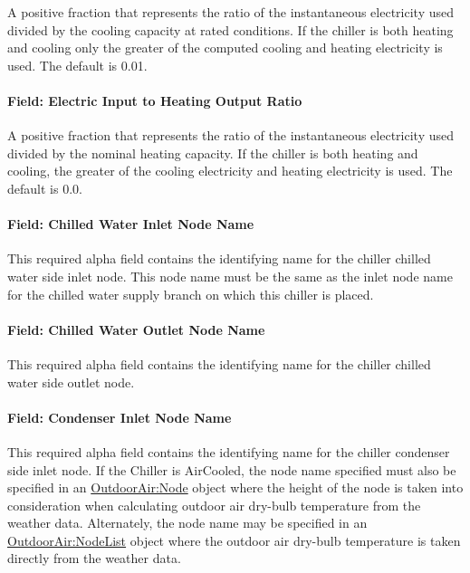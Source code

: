 A positive fraction that represents the ratio of the instantaneous electricity used divided by the cooling capacity at rated conditions. If the chiller is both heating and cooling only the greater of the computed cooling and heating electricity is used. The default is 0.01.

\paragraph{Field: Electric Input to Heating Output Ratio}\label{field-electric-input-to-heating-output-ratio}

A positive fraction that represents the ratio of the instantaneous electricity used divided by the nominal heating capacity. If the chiller is both heating and cooling, the greater of the cooling electricity and heating electricity is used. The default is 0.0.

\paragraph{Field: Chilled Water Inlet Node Name}\label{field-chilled-water-inlet-node-name-7}

This required alpha field contains the identifying name for the chiller chilled water side inlet node. This node name must be the same as the inlet node name for the chilled water supply branch on which this chiller is placed.

\paragraph{Field: Chilled Water Outlet Node Name}\label{field-chilled-water-outlet-node-name-8}

This required alpha field contains the identifying name for the chiller chilled water side outlet node.

\paragraph{Field: Condenser Inlet Node Name}\label{field-condenser-inlet-node-name-7}

This required alpha field contains the identifying name for the chiller condenser side inlet node. If the Chiller is AirCooled, the node name specified must also be specified in an \hyperref[outdoorairnode]{OutdoorAir:Node} object where the height of the node is taken into consideration when calculating outdoor air dry-bulb temperature from the weather data. Alternately, the node name may be specified in an \hyperref[outdoorairnodelist]{OutdoorAir:NodeList} object where the outdoor air dry-bulb temperature is taken directly from the weather data.

